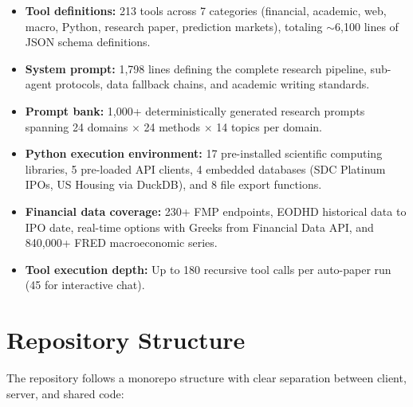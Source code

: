 \begin{itemize}
  \item \textbf{Tool definitions:} 213 tools across 7 categories (financial, academic, web, macro, Python, research paper, prediction markets), totaling $\sim$6,100 lines of JSON schema definitions.
  \item \textbf{System prompt:} 1,798 lines defining the complete research pipeline, sub-agent protocols, data fallback chains, and academic writing standards.
  \item \textbf{Prompt bank:} 1,000+ deterministically generated research prompts spanning 24 domains $\times$ 24 methods $\times$ 14 topics per domain.
  \item \textbf{Python execution environment:} 17 pre-installed scientific computing libraries, 5 pre-loaded API clients, 4 embedded databases (SDC Platinum IPOs, US Housing via DuckDB), and 8 file export functions.
  \item \textbf{Financial data coverage:} 230+ FMP endpoints, EODHD historical data to IPO date, real-time options with Greeks from Financial Data API, and 840,000+ FRED macroeconomic series.
  \item \textbf{Tool execution depth:} Up to 180 recursive tool calls per auto-paper run (45 for interactive chat).
\end{itemize}

\section{Repository Structure}
\label{sec:overview:repo}

The repository follows a monorepo structure with clear separation between client, server, and shared code:

